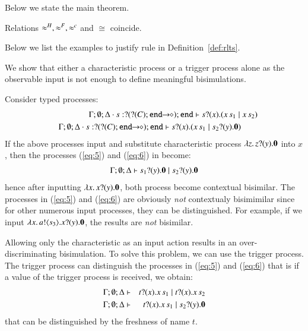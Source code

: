 \smallskip 

Below we state the main theorem.

\smallskip 

\begin{theorem}[Coincidence]\rm
	\label{the:coincidence}
	Relations $\approx^H, \approx^F, \approx^{c}$ and $\cong$ coincide.
\end{theorem}

\smallskip 

Below we list the examples to justify rule  in 
Definition~\ref{def:rlts}. 

\begin{example}
\label{ex:motivation}
We show that either a characteristic process or 
a trigger process alone as the observable input 
is not enough to define meaningful bisimulations. 

	Consider typed processes:
	\begin{eqnarray}
&& 	\Gamma; \es; \Delta \cat s: \btinp{\shot{\btinp{C} \tinact}} \tinact \proves \binp{s}{x} (\appl{x}{s_1} \Par \appl{x}{s_2})
\label{eq:5}
\\
&&		\Gamma; \es; \Delta \cat s: \btinp{\shot{\btinp{C} \tinact}} \tinact \proves \binp{s}{x} (\appl{x}{s_1} \Par \binp{s_2}{y} \inact)\quad\quad
\label{eq:6}
	\end{eqnarray}
	If the above processes input and substitute  
	characteristic  process $\lambda z.\,z ? (y) . \mathbf{0}$ into $x$, 
then the processes (\ref{eq:5}) and (\ref{eq:6}) in become:
	\begin{eqnarray*}
		\Gamma; \emptyset; \Delta \vdash s_1 ? (y) . \mathbf{0} \;|\; s_2 ? (y) . \mathbf{0}
	\end{eqnarray*}
hence after inputting $\lambda x.\,x ? (y) . \mathbf{0}$, 
both process become contextual bisimilar. 
The processes in (\ref{eq:5}) and (\ref{eq:6}) 
are obviously {\em not} contextualy bisimimilar since
for other numerous input processes, they can be distinguished. 
For example, if we input $\lambda x.\,a ! \langle s_3 \rangle . x ? (y) . \mathbf{0}$, 
the results are {\em not} bisimilar. 

Allowing only the characteristic as an input action
results in an over-discriminating bisimulation.
To solve this problem, we can use the trigger process. 
The trigger process can distinguish 
the processes in (\ref{eq:5}) and (\ref{eq:6}) 
that is if a value of the trigger process is received, 
we obtain:
%
\begin{eqnarray*}
	\Gamma; \emptyset; \Delta &\vdash& t ? (x) . x\, {s_1} \;|\; t ? (x) . x\, {s_2}
	\\
	\Gamma; \emptyset; \Delta &\vdash& t ? (x) . x\, {s_1} \;|\; s_2 ? (y) . \mathbf{0}
\end{eqnarray*}
\noi that can be distinguished by the freshness of name $t$.


\end{example}
